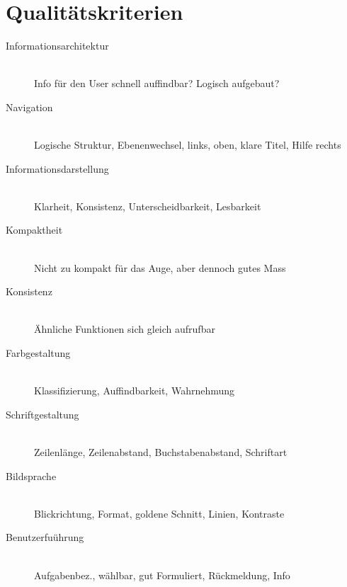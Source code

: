 \documentclass[a4paper,10pt]{article}
\begin{document}
\section{Qualit\"atskriterien}
\begin{description}
	\item[Informationsarchitektur] \hfill \\
		 Info für den User schnell auffindbar? Logisch aufgebaut?
	\item[Navigation] \hfill \\
		 Logische Struktur, Ebenenwechsel, links, oben, klare Titel, Hilfe rechts
	\item[Informationsdarstellung] \hfill \\
		 Klarheit, Konsistenz, Unterscheidbarkeit, Lesbarkeit
	\item[Kompaktheit] \hfill \\
		 Nicht zu kompakt für das Auge, aber dennoch gutes Mass
	\item[Konsistenz] \hfill \\
		 \"Ahnliche Funktionen sich gleich aufrufbar
	\item[Farbgestaltung] \hfill \\
		 Klassifizierung, Auffindbarkeit, Wahrnehmung
	\item[Schriftgestaltung] \hfill \\
		 Zeilenlänge, Zeilenabstand, Buchstabenabstand, Schriftart
	\item[Bildsprache] \hfill \\
		 Blickrichtung, Format, goldene Schnitt, Linien, Kontraste
	\item[Benutzerfu\"uhrung] \hfill \\
		 Aufgabenbez., w\"ahlbar, gut Formuliert, Rückmeldung, Info
\end{description}
\end{document}

